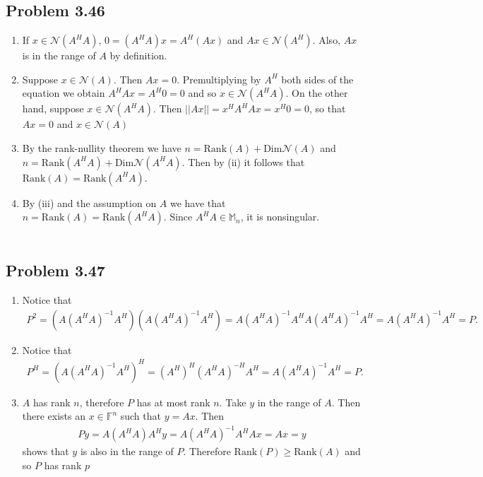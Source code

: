 \documentclass[letterpaper,12pt]{article}
\theoremstyle{definition}
\begin{document}
\begin{spacing}{1.3}{}
\subsection*{Problem 3.46}
\begin{enumerate}
    \item 	If $x\in\mathcal N(A^HA)$, $0=(A^HA)x=A^H(Ax)$ and $Ax\in\mathcal N(A^H)$.
	Also, $Ax$ is in the range of $A$ by definition.

\item
Suppose $x\in\mathcal N(A)$.
	Then $Ax=0$.
	Premultiplying by $A^H$ both sides of the equation we obtain $A^HAx=A^H0=0$
	and so $x\in\mathcal N(A^HA)$.
	On the other hand, suppose $x\in\mathcal N(A^HA)$.
	Then $||Ax||=x^HA^HAx=x^H0=0$, so that $Ax=0$ and $x\in\mathcal N(A)$
\item
	By the rank-nullity theorem we have $n=\text{Rank}(A)+\text{Dim}\mathcal N(A)$
	and $n=\text{Rank}(A^HA)+\text{Dim}\mathcal N(A^HA)$.
	Then by (ii) it follows that $\text{Rank}(A)=\text{Rank}(A^HA)$.
	\item
		By (iii) and the assumption on $A$ we have that $n=\text{Rank}(A)=\text{Rank}(A^HA)$.
	Since $A^HA\in\mathbb M_n$, it is nonsingular.\\\\

\end{enumerate}
\subsection*{Problem 3.47}
\begin{enumerate}
    \item
    	Notice that
	\begin{align*}
	P^2=(A(A^HA)^{-1}A^H)(A(A^HA)^{-1}A^H)=
	A(A^HA)^{-1}A^HA(A^HA)^{-1}A^H=
	A(A^HA)^{-1}A^H=P.
	\end{align*}
	\item
		Notice that
	\begin{align*}
	P^H=(A(A^HA)^{-1}A^H)^H=
	(A^H)^H(A^HA)^{-H}A^H=A(A^HA)^{-1}A^H=P.
	\end{align*}
	\item
    $A$ has rank $n$, therefore $P$ has at most rank $n$.
	Take $y$ in the range of $A$.
	Then there exists an $x\in\mathbb F^n$ such that $y=Ax$.
	Then
	\begin{align*}
	Py=A(A^HA)A^Hy=A(A^HA)^{-1}A^HAx=Ax=y
	\end{align*}
	shows that $y$ is also in the range of $P$.
	Therefore $\text{Rank}(P)\geq\text{Rank}(A)$ and so $P$ has rank $p$ \\
\end{enumerate}



\end{spacing}
\end{document}
